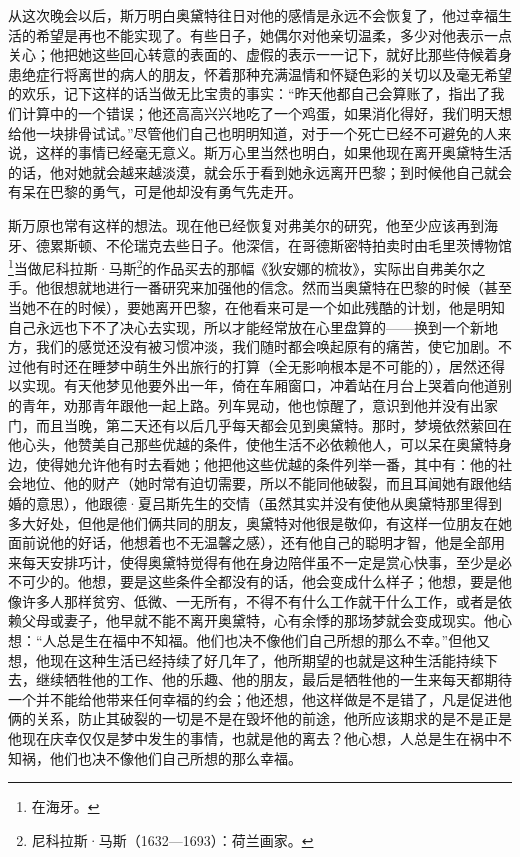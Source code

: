 \par 从这次晚会以后，斯万明白奥黛特往日对他的感情是永远不会恢复了，他过幸福生活的希望是再也不能实现了。有些日子，她偶尔对他亲切温柔，多少对他表示一点关心；他把她这些回心转意的表面的、虚假的表示一一记下，就好比那些侍候着身患绝症行将离世的病人的朋友，怀着那种充满温情和怀疑色彩的关切以及毫无希望的欢乐，记下这样的话当做无比宝贵的事实：“昨天他都自己会算账了，指出了我们计算中的一个错误；他还高高兴兴地吃了一个鸡蛋，如果消化得好，我们明天想给他一块排骨试试。”尽管他们自己也明明知道，对于一个死亡已经不可避免的人来说，这样的事情已经毫无意义。斯万心里当然也明白，如果他现在离开奥黛特生活的话，他对她就会越来越淡漠，就会乐于看到她永远离开巴黎；到时候他自己就会有呆在巴黎的勇气，可是他却没有勇气先走开。
\par 斯万原也常有这样的想法。现在他已经恢复对弗美尔的研究，他至少应该再到海牙、德累斯顿、不伦瑞克去些日子。他深信，在哥德斯密特拍卖时由毛里茨博物馆\footnote{在海牙。}当做尼科拉斯·马斯\footnote{尼科拉斯·马斯（1632—1693）：荷兰画家。}的作品买去的那幅《狄安娜的梳妆》，实际出自弗美尔之手。他很想就地进行一番研究来加强他的信念。然而当奥黛特在巴黎的时候（甚至当她不在的时候），要她离开巴黎，在他看来可是一个如此残酷的计划，他是明知自己永远也下不了决心去实现，所以才能经常放在心里盘算的——换到一个新地方，我们的感觉还没有被习惯冲淡，我们随时都会唤起原有的痛苦，使它加剧。不过他有时还在睡梦中萌生外出旅行的打算（全无影响根本是不可能的），居然还得以实现。有天他梦见他要外出一年，倚在车厢窗口，冲着站在月台上哭着向他道别的青年，劝那青年跟他一起上路。列车晃动，他也惊醒了，意识到他并没有出家门，而且当晚，第二天还有以后几乎每天都会见到奥黛特。那时，梦境依然萦回在他心头，他赞美自己那些优越的条件，使他生活不必依赖他人，可以呆在奥黛特身边，使得她允许他有时去看她；他把他这些优越的条件列举一番，其中有：他的社会地位、他的财产（她时常有迫切需要，所以不能同他破裂，而且耳闻她有跟他结婚的意思），他跟德·夏吕斯先生的交情（虽然其实并没有使他从奥黛特那里得到多大好处，但他是他们俩共同的朋友，奥黛特对他很是敬仰，有这样一位朋友在她面前说他的好话，他想着也不无温馨之感），还有他自己的聪明才智，他是全部用来每天安排巧计，使得奥黛特觉得有他在身边陪伴虽不一定是赏心快事，至少是必不可少的。他想，要是这些条件全都没有的话，他会变成什么样子；他想，要是他像许多人那样贫穷、低微、一无所有，不得不有什么工作就干什么工作，或者是依赖父母或妻子，他早就不能不离开奥黛特，心有余悸的那场梦就会变成现实。他心想：“人总是生在福中不知福。他们也决不像他们自己所想的那么不幸。”但他又想，他现在这种生活已经持续了好几年了，他所期望的也就是这种生活能持续下去，继续牺牲他的工作、他的乐趣、他的朋友，最后是牺牲他的一生来每天都期待一个并不能给他带来任何幸福的约会；他还想，他这样做是不是错了，凡是促进他俩的关系，防止其破裂的一切是不是在毁坏他的前途，他所应该期求的是不是正是他现在庆幸仅仅是梦中发生的事情，也就是他的离去？他心想，人总是生在祸中不知祸，他们也决不像他们自己所想的那么幸福。
